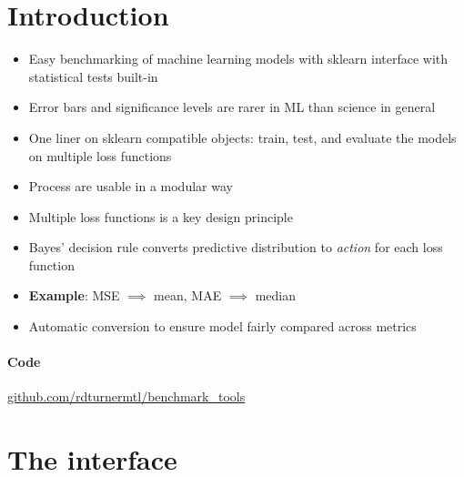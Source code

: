 \documentclass[a0,landscape]{a0poster}
\newcommand{\mysection}[1]{\section*{\fontsize{67.1}{82} \selectfont \color{NavyBlue} #1 \color{Black}}}
\begin{document}
\begin{multicols}{3} %


\Large

\mysection{Introduction}

\begin{itemize}
  \item Easy benchmarking of machine learning models with sklearn interface with statistical tests built-in
  \item Error bars and significance levels are rarer in ML than science in general
  \item One liner on sklearn compatible objects: train, test, and evaluate the models on multiple loss functions
  \item Process are usable in a modular way
\end{itemize}

\begin{itemize}
  \item Multiple loss functions is a key design principle
  \item Bayes' decision rule converts predictive distribution to \emph{action} for each loss function
  \item \textbf{Example}: MSE $\implies$ mean, MAE $\implies$ median
  \item Automatic conversion to ensure model fairly compared across metrics
\end{itemize}

\paragraph{Code}
\centering
\large {\url{github.com/rdturnermtl/benchmark_tools}}

\mysection{The interface}


\end{multicols}
\end{document}
